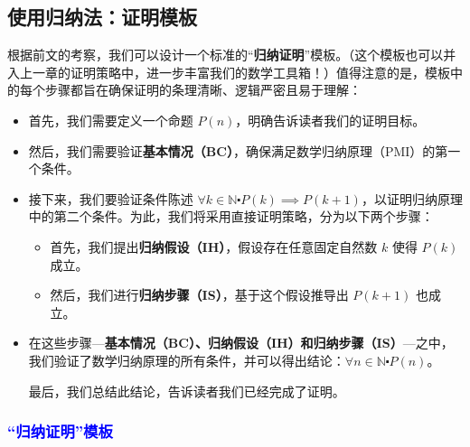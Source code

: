 \subsection{使用归纳法：证明模板}

根据前文的考察，我们可以设计一个标准的``\textbf{归纳证明}''模板。（这个模板也可以并入上一章的证明策略中，进一步丰富我们的数学工具箱！）值得注意的是，模板中的每个步骤都旨在确保证明的条理清晰、逻辑严密且易于理解：

\begin{itemize}
    \item 首先，我们需要定义一个命题 $P(n)$，明确告诉读者我们的证明目标。
    \item 然后，我们需要验证\textbf{基本情况（BC）}，确保满足数学归纳原理（PMI）的第一个条件。
    \item 接下来，我们要验证条件陈述 $\forall k \in \mathbb{N} \centerdot P(k) \implies P(k+1)$，以证明归纳原理中的第二个条件。为此，我们将采用直接证明策略，分为以下两个步骤：
        \begin{itemize}
            \item 首先，我们提出\textbf{归纳假设（IH）}，假设存在任意固定自然数 $k$ 使得 $P(k)$ 成立。
            \item 然后，我们进行\textbf{归纳步骤（IS）}，基于这个假设推导出 $P(k+1)$ 也成立。
        \end{itemize} 
    \item 在这些步骤---\textbf{基本情况（BC）、归纳假设（IH）和归纳步骤（IS）}---之中，我们验证了数学归纳原理的所有条件，并可以得出结论：$\forall n \in \mathbb{N} \centerdot P(n)$。
    
    最后，我们总结此结论，告诉读者我们已经完成了证明。
\end{itemize}

\subsubsection*{\textcolor{blue}{``归纳证明''模板}}

\setlength{\fboxrule}{2pt}
\setlength\fboxsep{5mm}
\begin{center}
\noindent {}
\end{center}

